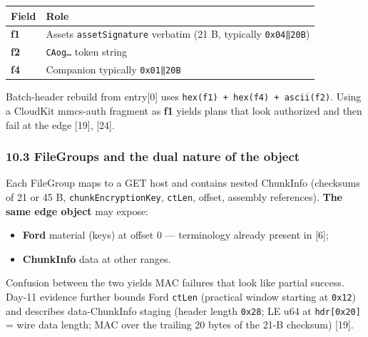 \documentclass[
  english,
  10pt]{article}
\newcounter{none} %
\providecommand{\tightlist}{%
  \setlength{\itemsep}{0pt}\setlength{\parskip}{0pt}}
\begin{document}
{\def\LTcaptype{none} %
\begin{longtable}[]{@{}
  >{\raggedright\arraybackslash}p{}
  >{\raggedright\arraybackslash}p{}@{}}
\toprule\noalign{}
\begin{minipage}[b]{\linewidth}\raggedright
Field
\end{minipage} & \begin{minipage}[b]{\linewidth}\raggedright
Role
\end{minipage} \\
\midrule\noalign{}
\endhead
\bottomrule\noalign{}
\endlastfoot
\textbf{f1} & Assets \texttt{assetSignature} verbatim (21 B, typically
\texttt{0x04‖20B}) \\
\textbf{f2} & \texttt{CAog…} token string \\
\textbf{f4} & Companion typically \texttt{0x01‖20B} \\
\end{longtable}
}

Batch-header rebuild from entry{[}0{]} uses
\texttt{hex(f1)\ +\ hex(f4)\ +\ ascii(f2)}. Using a CloudKit mmcs-auth
fragment as \textbf{f1} yields plans that look authorized and then fail
at the edge {[}19{]}, {[}24{]}.

\subsubsection{10.3 FileGroups and the dual nature of the
object}\label{filegroups-and-the-dual-nature-of-the-object}

Each FileGroup maps to a GET host and contains nested ChunkInfo
(checksums of 21 or 45 B, \texttt{chunkEncryptionKey}, \texttt{ctLen},
offset, assembly references). \textbf{The same edge object} may expose:

\begin{itemize}
\tightlist
\item
  \textbf{Ford} material (keys) at offset 0 --- terminology already
  present in {[}6{]};
\item
  \textbf{ChunkInfo} data at other ranges.
\end{itemize}

Confusion between the two yields MAC failures that look like partial
success. Day-11 evidence further bounds Ford \texttt{ctLen} (practical
window starting at \texttt{0x12}) and describes data-ChunkInfo staging
(header length \texttt{0x28}; LE u64 at \texttt{hdr{[}0x20{]}} = wire
data length; MAC over the trailing 20 bytes of the 21-B checksum)
{[}19{]}.
\end{document}
